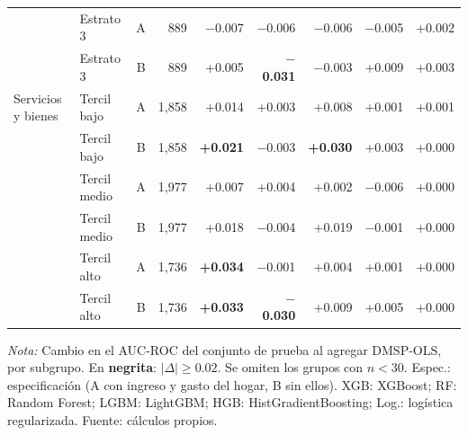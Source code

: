 \begin{table}[H]
\begin{tabular}{llrrrrrrr}
    \addlinespace
     & Estrato 3 & A & 889 & $-$0.007 & $-$0.006 & $-$0.006 & $-$0.005 & +0.002 \\
     & Estrato 3 & B & 889 & +0.005 & \textbf{$-$0.031} & $-$0.003 & +0.009 & +0.003 \\
    \midrule
    Servicios y bienes & Tercil bajo & A & 1{,}858 & +0.014 & +0.003 & +0.008 & +0.001 & +0.001 \\
     & Tercil bajo & B & 1{,}858 & \textbf{+0.021} & $-$0.003 & \textbf{+0.030} & +0.003 & +0.000 \\
    \addlinespace
     & Tercil medio & A & 1{,}977 & +0.007 & +0.004 & +0.002 & $-$0.006 & +0.000 \\
     & Tercil medio & B & 1{,}977 & +0.018 & $-$0.004 & +0.019 & $-$0.001 & +0.000 \\
    \addlinespace
     & Tercil alto & A & 1{,}736 & \textbf{+0.034} & $-$0.001 & +0.004 & +0.001 & +0.000 \\
     & Tercil alto & B & 1{,}736 & \textbf{+0.033} & \textbf{$-$0.030} & +0.009 & +0.005 & +0.000 \\
    \bottomrule
  \end{tabular}
  \begin{minipage}{0.95\textwidth}
    \vspace{4pt}
    \footnotesize \textit{Nota:} Cambio en el AUC-ROC del conjunto de prueba al
    agregar DMSP-OLS, por subgrupo. En \textbf{negrita}: $|\Delta|\geq 0.02$.
    Se omiten los grupos con $n<30$. Espec.: especificación (A con ingreso y
    gasto del hogar, B sin ellos). XGB: XGBoost; RF: Random Forest; LGBM:
    LightGBM; HGB: HistGradientBoosting; Log.: logística regularizada. Fuente: cálculos propios.
  \end{minipage}
\end{table}
